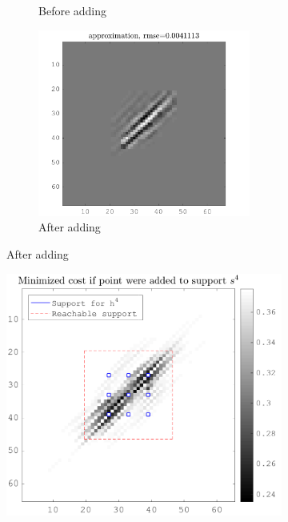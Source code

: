 \begin{figure}[!h]
\begin{subfigure}[b]{0.99\textwidth}
\begin{subfigure}[b]{0.32\textwidth}
	\caption{Before adding}
	\end{subfigure}
	\begin{subfigure}[b]{0.32\textwidth}\centering
	\includegraphics[width=\textwidth]{figures/before_after/xp_128x128_sc2_angl1_K3_S3_node4after_approx.png}
	\caption{After adding}
	\end{subfigure}
\end{subfigure}
\begin{subfigure}[b]{0.32\textwidth}\centering
\includegraphics[width=\textwidth]{figures/before_after/xp_128x128_sc2_angl1_K3_S3_node4before_objmatrix.png}

\end{subfigure}
\end{figure}
